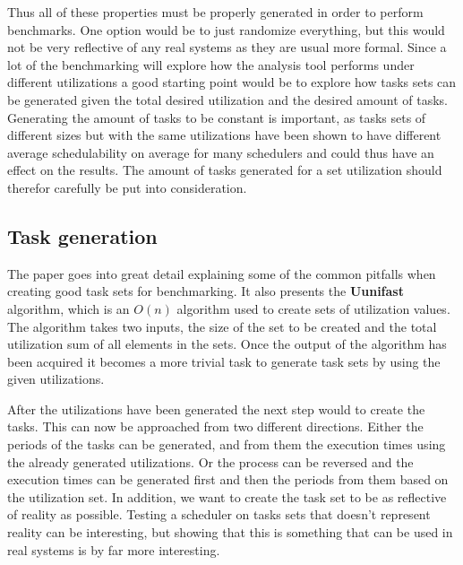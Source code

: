 \documentclass{kththesis}
\begin{document}
Thus all of these properties must be properly generated in order to perform benchmarks. One option
would be to just randomize everything, but this would not be very reflective of any real systems as
they are usual more formal. Since a lot of the benchmarking will explore how the analysis tool
performs under different utilizations a good starting point would be to explore how tasks sets can
be generated given the total desired utilization and the desired amount of tasks. Generating the
amount of tasks to be constant is important, as tasks sets of different sizes but with the same
utilizations have been shown to have different average
schedulability\parencite{sebestyen_simulation-based_2012} on average for many schedulers and could
thus have an effect on the results. The amount of tasks generated for a set utilization should
therefor carefully be put into consideration. 


\subsection{Task generation}

The paper \parencite{bini_measuring_2005} goes into great detail explaining some of the common pitfalls
when creating good task sets for benchmarking. It also presents the \textbf{Uunifast} algorithm,
which is an $O(n)$ algorithm used to create sets of utilization values. The algorithm takes two
inputs, the size of the set to be created and the total utilization sum of all elements in the sets.
Once the output of the algorithm has been acquired it becomes a more trivial task to generate task
sets by using the given utilizations.

After the utilizations have been generated the next step would to create the tasks. This can now be
approached from two different directions. Either the periods of the tasks can be generated, and from
them the execution times using the already generated utilizations. Or the process can be reversed
and the execution times can be generated first and then the periods from them based on the
utilization set. In addition, we want to create the task set to be as reflective of reality as
possible. Testing a scheduler on tasks sets that doesn't represent reality can be interesting, but
showing that this is something that can be used in real systems is by far more interesting.
\end{document}
